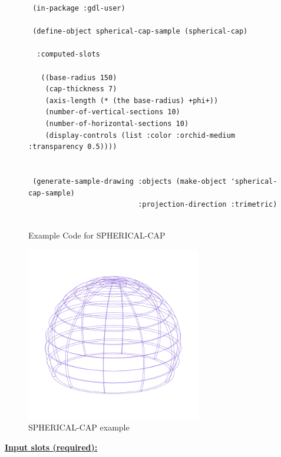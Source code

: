 \documentclass [11pt]{book}
\begin{document}
\begin{itemize}
\begin{figure}
\begin{lrbox}{\boxedverb}
\begin{minipage}{\linewidth}
{\begin{verbatim}
 (in-package :gdl-user)

 (define-object spherical-cap-sample (spherical-cap)
   
  :computed-slots

   ((base-radius 150)
    (cap-thickness 7)
    (axis-length (* (the base-radius) +phi+))
    (number-of-vertical-sections 10)
    (number-of-horizontal-sections 10)
    (display-controls (list :color :orchid-medium :transparency 0.5))))
  

 (generate-sample-drawing :objects (make-object 'spherical-cap-sample) 
                          :projection-direction :trimetric)
                  

\end{verbatim}}
\end{minipage}
\end{lrbox}
\fbox{\usebox{\boxedverb}}

\caption{Example Code for SPHERICAL-CAP}

\label{fig:example-code-SPHERICAL-CAP}

\end{figure}

\begin{figure}
\begin{center}
\includegraphics[width=3in,height=3in]{../images/example-spherical-cap.pdf}
\end{center}

\caption{SPHERICAL-CAP example}

\label{fig:SPHERICAL-CAP}

\end{figure}





\textbf{
\underline{Input slots (required):}}

\begin{description}


\end{description}
\end{itemize}
\end{document}
